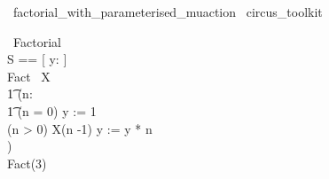 \begin{zsection}
  \SECTION\ factorial\_with\_parameterised\_muaction \parents\ circus\_toolkit
\end{zsection}

\begin{circus}
   \circprocess\ Factorial \circdef \circbegin \\
        \circstate S == [ y: \nat ] \\
        Fact \circdef \circmu\ X \circspot \\
            \t1 \circblockbegin
                (n: \nat \circspot \\
                    \t1 \circblockbegin
                            \circif (n = 0) \circthen y := 1 \\
                            \circelse (n > 0) \circthen X(n -1) \circseq y := y * n \\
                            \circfi
                        \circblockend)
                \circblockend \\
        \circspot Fact(3)
   \circend
\end{circus}